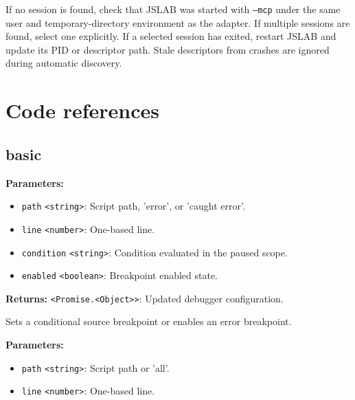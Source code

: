\documentclass[12pt,a4paper]{article}
\begin{document}
If no session is found, check that JSLAB was started with \texttt{--mcp} under the same user and temporary-directory environment as the adapter. If multiple sessions are found, select one explicitly. If a selected session has exited, restart JSLAB and update its PID or descriptor path. Stale descriptors from crashes are ignored during automatic discovery.



\section{Code references}

\subsection{basic}
\vspace{5mm}
\noindent {}


\noindent \textbf{Parameters:}
\begin{itemize}
  \item \texttt{path} \texttt{<string>}: Script path, 'error', or 'caught error'.
  \item \texttt{line} \texttt{<number>}: One-based line.
  \item \texttt{condition} \texttt{<string>}: Condition evaluated in the paused scope.
  \item \texttt{enabled} \texttt{<boolean>}: Breakpoint enabled state.
\end{itemize}

\noindent \textbf{Returns:} \texttt{<Promise.<Object>>}: Updated debugger configuration.

\noindent Sets a conditional source breakpoint or enables an error breakpoint.

\vspace{5mm}
\noindent {}


\noindent \textbf{Parameters:}
\begin{itemize}
  \item \texttt{path} \texttt{<string>}: Script path or 'all'.
  \item \texttt{line} \texttt{<number>}: One-based line.
\end{itemize}
\end{document}
